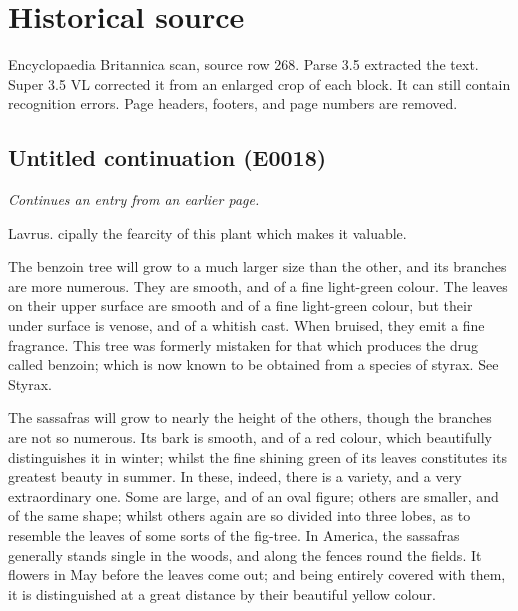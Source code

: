 \documentclass{article}
\begin{document}
\section*{Historical source}
Encyclopaedia Britannica scan, source row 268. Parse 3.5 extracted the text. Super 3.5 VL corrected it from an enlarged crop of each block. It can still contain recognition errors.
Page headers, footers, and page numbers are removed.

\subsection*{Untitled continuation (E0018)}
\textit{Continues an entry from an earlier page.}

Lavrus. cipally the fearcity of this plant which makes it valuable.

The benzoin tree will grow to a much larger size than the other, and its branches are more numerous. They are smooth, and of a fine light-green colour. The leaves on their upper surface are smooth and of a fine light-green colour, but their under surface is venose, and of a whitish cast. When bruised, they emit a fine fragrance. This tree was formerly mistaken for that which produces the drug called benzoin; which is now known to be obtained from a species of styrax. See Styrax.

The sassafras will grow to nearly the height of the others, though the branches are not so numerous. Its bark is smooth, and of a red colour, which beautifully distinguishes it in winter; whilst the fine shining green of its leaves constitutes its greatest beauty in summer. In these, indeed, there is a variety, and a very extraordinary one. Some are large, and of an oval figure; others are smaller, and of the same shape; whilst others again are so divided into three lobes, as to resemble the leaves of some sorts of the fig-tree. In America, the sassafras generally stands single in the woods, and along the fences round the fields. It flowers in May before the leaves come out; and being entirely covered with them, it is distinguished at a great distance by their beautiful yellow colour.
\end{document}
